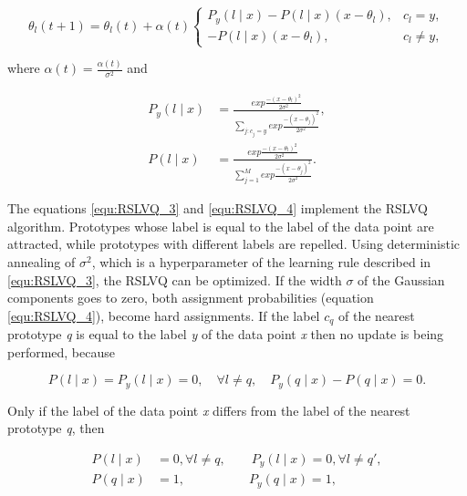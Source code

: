 \documentclass[12pt,oneside,a4paper,parskip]{scrbook}
\begin{document}
\begin{equation}
  \theta_l(t + 1) = \theta_l(t) + \alpha(t) 
  \begin{cases}
    P_y(l\mid x) - P(l\mid x)(x-\theta_l),  &c_l = y,  \\
    - P(l\mid x)(x-\theta_l),               &c_l \neq y,              
  \end{cases}
  \label{equ:RSLVQ_3}
\end{equation}

where $\alpha(t) = \frac{\alpha(t)}{\sigma^2}$ and

\begin{equation}
  \begin{split}
    P_y(l\mid x) &= \frac{exp \frac{-(x-\theta_l)^2}{2\sigma^2}}{\displaystyle\sum_{j:c_j = y} exp \frac{-(x-\theta_j)^2}{2\sigma^2}}, \\
    P(l\mid x) &= \frac{exp \frac{-(x-\theta_l)^2}{2\sigma^2}}{\displaystyle\sum_{j=1}^{M} exp \frac{-(x-\theta_j)^2}{2\sigma^2}}.
  \end{split}
  \label{equ:RSLVQ_4}
\end{equation}

The equations \ref{equ:RSLVQ_3} and \ref{equ:RSLVQ_4} implement the RSLVQ algorithm. Prototypes whose label is equal to 
the label of the data point are attracted, while prototypes with different labels are repelled. Using deterministic annealing
of $\sigma^2$, which is a hyperparameter of the learning rule described in \ref{equ:RSLVQ_3}, the RSLVQ can be optimized.
If the width $\sigma$ of the Gaussian components goes to zero, both assignment probabilities (equation \ref{equ:RSLVQ_4}),
become hard assignments. If the label $c_q$ of the nearest prototype \textit{q} is equal to the label \textit{y} of the data
point \textit{x} then no update is being performed, because 

\begin{equation}
  P(l\mid x) = P_y(l\mid x) = 0, \quad \forall l \neq q, \quad P_y(q\mid x)-P(q\mid x) = 0.
\end{equation}

Only if the label of the data point \textit{x} differs from the label of the nearest prototype \textit{q}, then

\begin{equation}
  \begin{split}
    P(l\mid x) &= 0, \forall l \neq q, \quad \quad P_y(l\mid x) = 0, \forall l \neq q',\\
    P(q\mid x) &= 1, \quad \quad \quad \quad \quad P_y(q\mid x) = 1,
  \end{split}
\end{equation}
\end{document}
